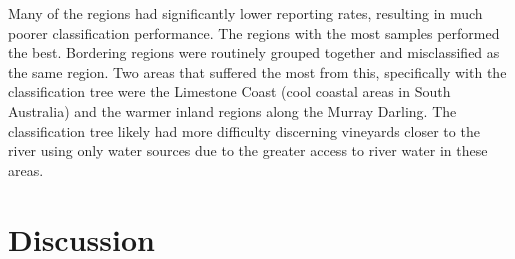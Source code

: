 \documentclass[review,12pt,authoryear]{elsarticle}
\begin{document}
\begin{linenumbers}
\par
Many of the regions had significantly lower reporting rates, resulting in much poorer classification performance. The regions with the most samples performed the best. Bordering regions were routinely grouped together and misclassified as the same region. Two areas that suffered the most from this, specifically with the classification tree were the Limestone Coast (cool coastal areas in South Australia) and the warmer inland regions along the Murray Darling. The classification tree likely had more difficulty discerning vineyards closer to the river using only water sources due to the greater access to river water in these areas.


\section{Discussion}


\end{linenumbers}
\end{document}
